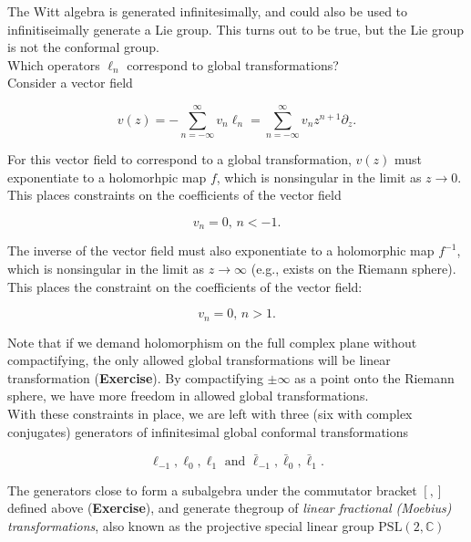 \noindent The Witt algebra is generated infinitesimally, and could also be used to infinitiseimally generate a Lie group. This turns out to be true, but the Lie group is not the conformal group. \\

\noindent Which operators $\ell_n$ correspond to global transformations? \\

\noindent Consider a vector field 

\begin{equation}
v(z) = - \sum_{n=-\infty}^{\infty} v_n \ell_n = \sum_{n=-\infty}^{\infty} v_n z^{n+1} \partial_z.
\end{equation}

\noindent For this vector field to correspond to a global transformation, $v(z)$ must exponentiate to a holomorhpic map $f$, which is nonsingular in the limit as $z \rightarrow 0$. This places constraints on the coefficients of the vector field 

\begin{equation}
v_n = 0, \, n < -1.
\end{equation}

\noindent The inverse of the vector field must also exponentiate to a holomorphic map $f^{-1}$, which is nonsingular in the limit as $z \rightarrow \infty$ (e.g., exists on the Riemann sphere). This places the constraint on the coefficients of the vector field: 

\begin{equation}
v_n = 0, \, n>1.
\end{equation}

\noindent Note that if we demand holomorphism on the full complex plane without compactifying, the only allowed global transformations will be linear transformation (\textbf{Exercise}). By compactifying $\pm \infty$ as a point onto the Riemann sphere, we have more freedom in allowed global transformations. \\

\noindent With these constraints in place, we are left with three (six with complex conjugates) generators of infinitesimal global conformal transformations

\begin{equation}
\ell_{-1}, \ell_0 , \ell_1 \text{ and } \bar{\ell}_{-1}, \bar{\ell}_0, \bar{\ell}_1.
\end{equation}

\noindent The generators close to form a subalgebra under the commutator bracket $[,]$ defined above (\textbf{Exercise}), and generate thegroup of \textit{linear fractional (Moebius) transformations}, also known as the projective special linear group $\text{PSL}(2,\mathbb{C})$


